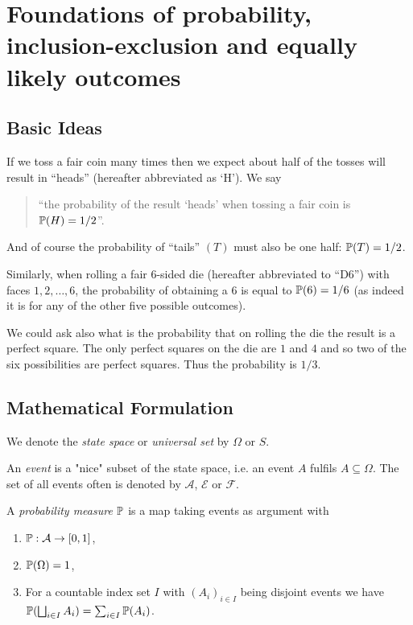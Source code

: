 \section{Foundations of probability, inclusion-exclusion and equally likely outcomes}

\subsection{Basic Ideas}
If we toss a fair coin many times then we expect about half of the tosses will result in ``heads'' (hereafter abbreviated as `H'). We say
\begin{quotation}
   ``the probability of the result `heads' when tossing a fair coin is ${\mathbb P}(H) = 1/2$''. 
\end{quotation}
And of course the probability of ``tails'' $(T)$ must also be one half: ${\mathbb P}(T)=1/2$.

Similarly, when rolling a fair $6$-sided die (hereafter abbreviated to ``D6'') with faces $1,2,\dots,6$, the probability of obtaining a $6$ is equal to ${\mathbb P} (6) = 1/6$ (as indeed it is for any of the other five possible outcomes).

We could ask also what is the probability that on rolling the die the result is a perfect square.  The only perfect squares on the die are $1$ and $4$ and so two of the six possibilities are perfect squares. Thus the probability is $1/3$.
\subsection{Mathematical Formulation}
\begin{defn}
We denote the \emph{state space} or \emph{universal set} by $\Omega$ or $S$. 
\end{defn}
\begin{defn}
An \emph{event} is a "nice" subset of the state space, i.e. an event $A$ fulfils $A \subseteq \Omega$.
The set of all events often is denoted by $\mathcal{A}$, $\mathcal{E}$ or $\mathcal{F}$.
\end{defn}
\begin{defn}
A \emph{probability measure} ${\mathbb P}$ is a map taking events as argument with
\begin{enumerate}
\item ${\mathbb P}: \mathcal{A} \to [0,1]$,
\item ${\mathbb P}(\Omega)=1$,
\item For a countable index set $I$ with $(A_i)_{i \in I}$ being disjoint events we have ${\mathbb P}( \bigsqcup_{i \in I} A_i) = \sum_{i\in I} {\mathbb P}(A_i)$.
\end{enumerate}
\end{defn}
